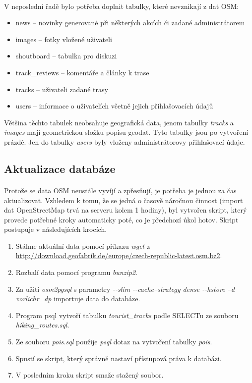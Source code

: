 \documentclass[11pt,a4paper,titlepage,oneside]{book}
\begin{document}
				\paragraph{} V neposlední řadě bylo potřeba doplnit tabulky, které nevznikají z dat \acl{OSM}:
					\begin{itemize}
						\item news -- novinky generované při některých akcích či zadané administrátorem
						\item images -- fotky vložené uživateli
						\item shoutboard -- tabulka pro diskuzi
						\item track\_reviews -- komentáře a články k trase
						\item tracks -- uživateli zadané trasy
						\item users -- informace o uživatelích včetně jejich přihlašovacích údajů
					\end{itemize}
Většina těchto tabulek neobsahuje geografická data, jenom tabulky \textit{tracks} a \textit{images} mají geometrickou složku popisu geodat. Tyto tabulky jsou po vytvoření prázdé. Jen do tabulky \textit{users} byly vloženy administrátorovy přihlašovací údaje.
			\subsection{Aktualizace databáze}
				\paragraph{} Protože se data \acl{OSM} neustále vyvíjí a zpřesňují, je potřeba je jednou za čas aktualizovat. Vzhledem k tomu, že se jedná o časově náročnou činnost (import dat OpenStreetMap trvá na serveru kolem 1 hodiny), byl vytvořen skript, který provede potřebné kroky automaticky poté, co je předchozí úkol hotov. Skript postupuje v následujících krocích.
		\begin{enumerate}
			\item Stáhne aktuální data pomocí příkazu \textit{wget}  z \url{http://download.geofabrik.de/europe/czech-republic-latest.osm.bz2}.
			\item Rozbalí data pomocí programu \textit{bunzip2}.
			\item Za užití \textit{osm2pgsql} s parametry \textit{ -\--slim  -\--cache--strategy dense -\--hstore --d vorlichr\_dp} importuje data do databáze.
			\item Program psql vytvoří tabulku \textit{tourist\_tracks} podle SELECTu ze souboru \textit{hiking\_routes.sql}.
			\item Ze souboru \textit{pois.sql} použije \textit{psql} dotaz na vytvoření tabulky \textit{pois}.
			\item Spustí se skript, který správně nastaví přístupová práva k databázi.
			\item V posledním kroku skript smaže stažený soubor.
		\end{enumerate}
\end{document}
